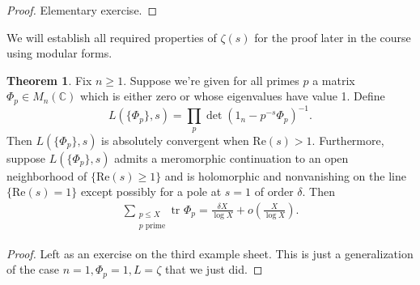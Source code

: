 \documentclass{article}
\theoremstyle{definition}
\newtheorem{theorem}{Theorem}[section]
\begin{document}
\begin{proof}
    Elementary exercise.
\end{proof}
We will establish all required properties of $\zeta(s)$ for the proof later in the course using modular forms.
\begin{theorem}\label{theorem4.8}
    Fix $n\ge 1$. Suppose we're given for all primes $p$ a matrix $\Phi_p \in M_n(\mathbb{C})$ which is either zero or whose eigenvalues have value 1. Define $$L(\{\Phi_p\},s) = \prod_{p}^{} \det(1_n - p^{-s}\Phi_p)^{-1}.$$
    Then $L(\{\Phi_p\}, s)$ is absolutely convergent when $\text{Re}(s)>1$. Furthermore, suppose $L(\{\Phi_p\},s)$ admits a meromorphic continuation to an open neighborhood of $\{\text{Re}(s)\ge 1\}$ and is holomorphic and nonvanishing on the line $\{\text{Re}(s)=1\}$ except possibly for a pole at $s=1$ of order $\delta$. Then 
    \begin{align*}
        \sum_{\substack{p\le X\\p \text{ prime}}} \text{tr }\Phi_p = \frac{\delta X}{\log X} + o \left(\frac{X}{\log X}\right).
    \end{align*}
\end{theorem}
\begin{proof}
    Left as an exercise on the third example sheet. This is just a generalization of the case $n=1, \Phi_p = 1, L =\zeta$ that we just did.
\end{proof}
\end{document}

